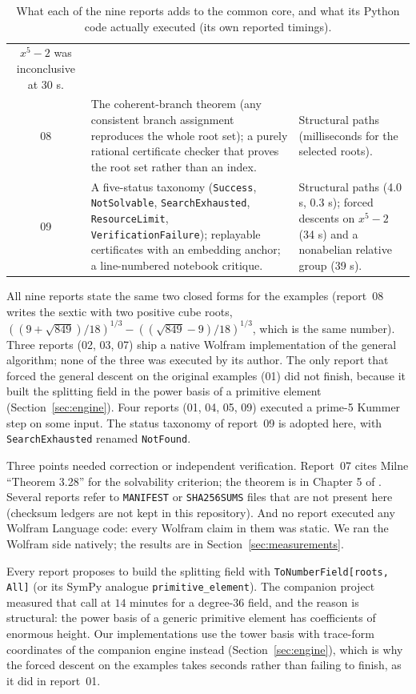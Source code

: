 \documentclass[11pt,a4paper]{article}
\theoremstyle{definition}
\theoremstyle{remark}
\newcommand{\code}[1]{\texttt{#1}}
\begin{document}
\begin{table}[htbp]
\begin{tabularx}{\textwidth}{@{}c>{\raggedright\arraybackslash}X>{\raggedright\arraybackslash}X@{}}
$x^5-2$ was inconclusive at 30 s.\\
08 & The coherent-branch theorem (any consistent branch assignment reproduces the whole
root set); a purely rational certificate checker that proves the root set rather than an
index. & Structural paths (milliseconds for the selected roots).\\
09 & A five-status taxonomy (\code{Success}, \code{NotSolvable}, \code{SearchExhausted},
\code{ResourceLimit}, \code{VerificationFailure}); replayable certificates with an
embedding anchor; a line-numbered notebook critique. & Structural paths (4.0 s, 0.3 s);
forced descents on $x^5-2$ (34 s) and a nonabelian relative group (39 s).\\
\bottomrule
\end{tabularx}
\caption{What each of the nine reports adds to the common core, and what its Python code
actually executed (its own reported timings).}\label{tab:reports}
\end{table}

All nine reports state the same two closed forms for the examples (report~08 writes the
sextic with two positive cube roots, $((9+\sqrt{849})/18)^{1/3}-((\sqrt{849}-9)/18)^{1/3}$,
which is the same number).  Three reports (02, 03, 07) ship a native Wolfram
implementation of the general algorithm; none of the three was executed by its author.
The only report that forced the general descent on the original examples (01) did not
finish, because it built the splitting field in the power basis of a primitive element
(Section~\ref{sec:engine}).  Four reports (01, 04, 05, 09) executed a prime-5 Kummer step
on some input.  The status taxonomy of report~09 is adopted here, with
\code{SearchExhausted} renamed \code{NotFound}.

Three points needed correction or independent verification.  Report~07 cites Milne
``Theorem 3.28'' for the solvability criterion; the theorem is in Chapter 5 of
\cite{Milne}.  Several reports refer to \code{MANIFEST} or \code{SHA256SUMS} files that
are not present here (checksum ledgers are not kept in this repository).  And no report
executed any Wolfram Language code: every Wolfram claim in them was static.  We ran the
Wolfram side natively; the results are in Section~\ref{sec:measurements}.

Every report proposes to build the splitting field with
\code{ToNumberField[roots, All]} (or its SymPy analogue \code{primitive\_element}).
The companion project measured that call at $14$ minutes for a degree-$36$ field, and
the reason is structural: the power basis of a generic primitive element has
coefficients of enormous height.  Our implementations use the tower basis with
trace-form coordinates of the companion engine instead (Section~\ref{sec:engine}), which
is why the forced descent on the examples takes seconds rather than failing to finish, as
it did in report~01.
\end{document}
